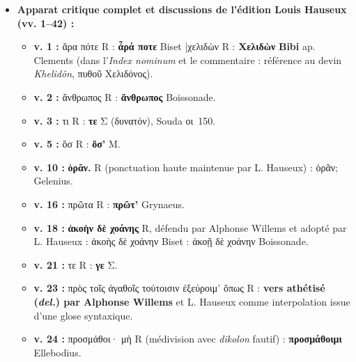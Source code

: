 \documentclass[10pt, a4paper, twoside]{book}
\renewcommand{\_}{\origunderscore\penalty0\relax}
\renewcommand{\texttt}[1]{#1}
\providecommand{\italique}[1]{\emph{#1}}
\providecommand{\latin}[1]{\textit{#1}}
\providecommand{\lecon}[1]{\textbf{#1}}
\providecommand{\expo}[1]{\textsuperscript{#1}}
\providecommand{\Rac}{R\expo{ac}}
\providecommand{\Rpc}{R\expo{pc}}
\providecommand{\Mon}{M}
\providecommand{\espApp}{\hspace{0.5em}|\hspace{0.5em}}
\begin{document}
\begin{itemize}
\begin{itemize}
    \item \textbf{Omission de vers réparée en marge (v. 33) :} Le \textbf{v. 33} (μῶν ὁ δασυπώγων; --- οὐχ ἑόρακας πώποτε) avait été omis par saut du même au même dans la colonne par \Rac{} (et reste \textbf{omis dans \Mon{}}) ; il est rajouté sur deux lignes dans la marge droite par \Rpc{}.
    \item \textbf{Grattage au v. 34 et correction \latin{in rasura} au v. 35 :} Au v.~34, \Rac{} avait écrit καὶ μεγ' (copié tel quel par \Mon{}) ; \Rpc{} a gratté l'iota (ὶ eras.) pour amorcer la crase κἀμέ γ'. Au \textbf{v.~35}, le second β de \texttt{βεβίνηκας} est corrigé \latin{in rasura} sur un α gratté (\texttt{βεαίνηκας} \Rac{}), ce qui, joint au silence complet de Σ\textsuperscript{R}, motive les \latin{cruces} \lecon{†βεβίνηκας†} de \lecon{Bibi}.
  \end{itemize}
  \item \textbf{Apparat critique complet et discussions de l'édition Louis Hauseux (\texttt{vv. 1–42}) :}
  \begin{itemize}
    \item \textbf{v. 1 :} ἄρα πότε R : \lecon{ἆρά ποτε} Biset \espApp χελιδὼν R : \lecon{Χελιδὼν} \lecon{Bibi} ap. Clements (dans l'\italique{Index nominum} et le commentaire : référence au devin \italique{Khelidôn}, πυθοῦ Χελιδόνος).
    \item \textbf{v. 2 :} ἄνθρωπος R : \lecon{ἅνθρωπος} Boissonade.
    \item \textbf{v. 3 :} τι R : \lecon{τε} Σ (δυνατόν), Souda οι~150.
    \item \textbf{v. 5 :} ὅσ R : \lecon{ὅσ'} \Mon{}.
    \item \textbf{v. 10 :} \lecon{ὁρᾶν.} R (ponctuation haute maintenue par L. Hauseux) : ὁρᾶν; Gelenius.
    \item \textbf{v. 16 :} πρῶτα R : \lecon{πρῶτ'} Grynaeus.
    \item \textbf{v. 18 :} \lecon{ἀκοὴν δὲ χοάνης} R, défendu par Alphonse Willems et adopté par L. Hauseux : ἀκοὴς δὲ χοάνην Biset : ἀκοῇ δὲ χοάνην Boissonade.
    \item \textbf{v. 21 :} τε R : \lecon{γε} Σ.
    \item \textbf{v. 23 :} πρὸς τοῖς ἀγαθοῖς τούτοισιν ἐξεύροιμ' ὅπως R : \textbf{vers athétisé (\italique{del.}) par Alphonse Willems} et L. Hauseux comme interpolation issue d'une glose syntaxique.
    \item \textbf{v. 24 :} προσμάθοι· μὴ R (médivision avec \italique{dikolon} fautif) : \lecon{προσμάθοιμι} Ellebodius.

\end{itemize}
\end{itemize}
\end{document}
